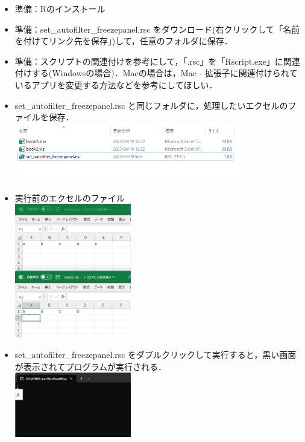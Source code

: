 \documentclass[
]{article}
\providecommand{\tightlist}{%
  \setlength{\itemsep}{0pt}\setlength{\parskip}{0pt}}
\begin{document}
\begin{itemize}
\tightlist
\item
  準備：Rのインストール\\
\item
  準備：set\_autofilter\_freezepanel.rsc
  をダウンロード(右クリックして「名前を付けてリンク先を保存」)して，任意のフォルダに保存．\\
\item
  準備：スクリプトの関連付けを参考にして，「.rsc」を「Rscript.exe」に関連付けする(Windowsの場合)．Macの場合は，Mac - 拡張子に関連付けられているアプリを変更する方法などを参考にしてほしい．\\
\item
  set\_autofilter\_freezepanel.rsc と同じフォルダに，処理したいエクセルのファイルを保存．\\
  \includegraphics[width=0.8\textwidth,height=\textheight]{img/set_autofilter_freezepanel01.png}\\
\item
  実行前のエクセルのファイル\\
  \includegraphics[width=0.4\textwidth,height=\textheight]{img/set_autofilter_freezepanel02.png}\\
\item
  set\_autofilter\_freezepanel.rsc をダブルクリックして実行すると，黒い画面が表示されてプログラムが実行される．\\
  \includegraphics[width=0.4\textwidth,height=\textheight]{img/set_autofilter_freezepanel03.png}\\

\end{itemize}
\end{document}
